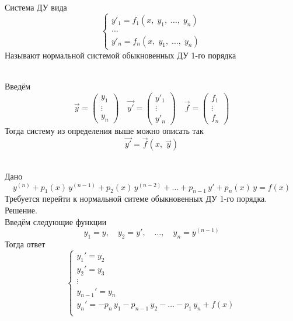\begin{Def}~\\
    Система ДУ вида
    \[
        \begin{cases}
            y'_1 = f_1(x,\; y_1,\; \dots,\; y_n)\\
            \dots\\
            y'_n = f_n(x,\; y_1,\; \dots,\; y_n)
        \end{cases}
    \]
    Называют нормальной системой обыкновенных ДУ 1-го порядка
\end{Def}

\begin{Note}~\\
    Введём 
    \[
        \vec{y} = \begin{pmatrix} y_1\\ \vdots\\ y_n \end{pmatrix} \quad \vec{y'} = \begin{pmatrix} y'_1\\ \vdots\\ y'_n \end{pmatrix} \quad \vec{f} = \begin{pmatrix} f_1\\ \vdots\\ f_n \end{pmatrix}
    \]
    Тогда систему из определения выше можно описать так
    \[
        \vec{y'} = \vec{f}(x,\; \vec{y})
    \]
\end{Note}

\begin{Example}~\\
    Дано
    \[
        y^{(n)} + p_1(x)\,y^{(n-1)} + p_2(x)\,y^{(n-2)} + \dots + p_{n-1}\,y' + p_n(x)\,y = f(x)
    \]
    Требуется перейти к нормальной ситеме обыкновенных ДУ 1-го порядка.\\
    Решение.\\
    Введём следующие функции
    \[
        y_1 = y, \quad y_2 = y', \quad \dots, \quad y_n = y^{(n-1)}
    \]
    Тогда ответ
    \[
        \begin{cases}
            y_1' = y_2\\
            y_2' = y_3\\
            \vdots\\
            y_{n-1}' = y_n\\
            y_n' = -p_n\,y_1 - p_{n-1}\,y_2 - \dots - p_1\,y_n + f(x)\\
        \end{cases}
    \]
\end{Example}

